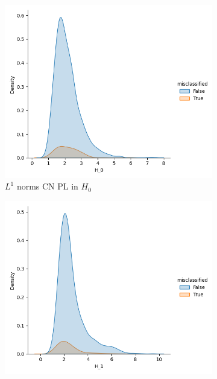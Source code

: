 \documentclass{article}
\begin{document}
\begin{figure}[htb]
  \centering
  \begin{subfigure}{0.32\textwidth}
    \includegraphics[width=\textwidth]{figures/misclassification_distance/distribution_distance_misclassified_CN_H_0.png}
    \caption{$L^1$ norms CN PL in $H_0$}
  \end{subfigure}
  \begin{subfigure}{0.32\textwidth}
    \includegraphics[width=\textwidth]{figures/misclassification_distance/distribution_distance_misclassified_CN_H_1.png}

\end{subfigure}
\end{figure}
\end{document}
